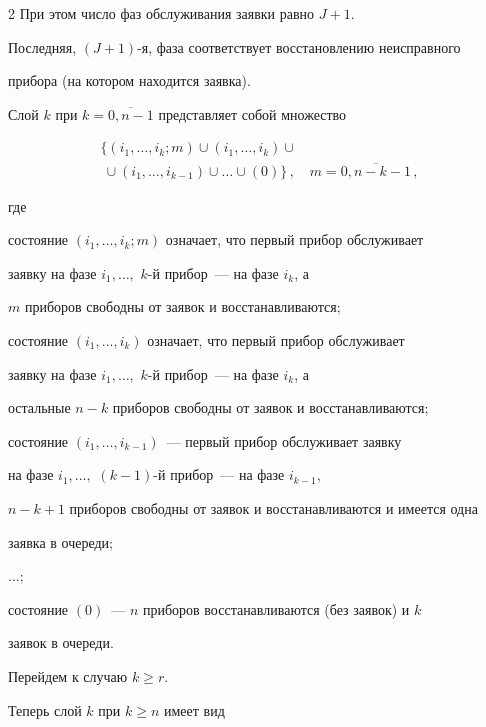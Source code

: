 \begin{multicols}{2}
При этом число фаз обслуживания заявки равно $J+1$.


Последняя, $(J{+}1)$-я, фаза соответствует восстановлению неисправного


прибора (на котором находится заявка).


Слой $k$ при $k=\overline{0,n-1}$ представляет собой множество


\begin{multline*}


\!\!\{(i_1,\ldots,i_k;m) \cup


(i_1,\ldots,i_k) \cup\\


\ \cup (i_1,\ldots,i_{k-1})


\cup \ldots \cup


(0)\}\,,\quad


  m=\overline{0,n-k-1}\,,


\end{multline*}


где


состояние $(i_1,\ldots,i_k;m)$ означает, что первый прибор обслуживает


заявку на фазе $i_1,\ldots,$ $k$-й прибор~--- на фазе $i_k$, а


$m$ приборов свободны от заявок и восстанавливаются;


состояние $(i_1,\ldots,i_k)$ означает, что первый прибор обслуживает


заявку на фазе $i_1,\ldots,$ $k$-й прибор~--- на фазе $i_k$, а


остальные $n-k$ приборов свободны от заявок и восстанавливаются;


состояние $(i_1,\ldots,i_{k-1})$~--- первый прибор обслуживает заявку


на фазе $i_1,\ldots,$ $(k{-}1)$-й прибор~--- на фазе $i_{k-1}$,


$n-k+1$ приборов свободны от заявок и восстанавливаются и имеется одна


заявка в очереди;


$\ldots;$


состояние $(0)$~--- $n$ приборов восстанавливаются (без заявок) и $k$


заявок в очереди.





Перейдем к случаю $k\geq r$.


Теперь слой $k$ при $k \geq n$ имеет вид


$$



\end{multicols}
